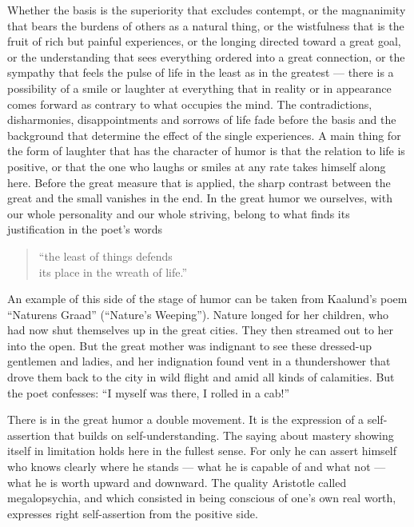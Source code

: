 \documentclass[12pt]{book}
\newcommand{\opage}[1]{\marginnote{\footnotesize\textit{[#1]}}}
\begin{document}
Whether the basis is the superiority that excludes contempt, or the magnanimity
that bears the burdens of others as a natural thing, or the wistfulness that is
the fruit of rich but painful experiences, or the longing directed toward a great
goal, or the understanding that sees everything ordered into a great connection,
or the sympathy that feels the pulse of life in the least as in the greatest ---
there is a possibility of a smile or laughter at everything that in reality or in
appearance comes forward as contrary to what occupies the mind. The contradictions,
disharmonies, disappointments and sorrows of life fade before the basis and the
background that determine the effect of the single experiences. A main thing for
the form of laughter that has the character of humor is that the relation to life
is positive, or that the one who laughs or smiles at any rate takes himself along
here. Before the great measure that is applied, the sharp contrast between the
great and the small vanishes in the end. In the great humor we ourselves, with our
whole personality and our whole striving, belong to what finds its justification in
the poet's words
\begin{quote}
``the least of things defends\\
its place in the wreath of life.''
\end{quote}

\opage{57}An example of this side of the stage of humor can be taken from
Kaalund's poem ``Naturens Graad'' (``Nature's Weeping''). Nature longed for her
children, who had now shut themselves up in the great cities. They then streamed
out to her into the open. But the great mother was indignant to see these dressed-up
gentlemen and ladies, and her indignation found vent in a thundershower that drove
them back to the city in wild flight and amid all kinds of calamities. But the poet
confesses: ``I myself was there, I rolled in a cab!''

There is in the great humor a double movement. It is the expression of a
self-assertion that builds on self-understanding. The saying about mastery showing
itself in limitation holds here in the fullest sense. For only he can assert himself
who knows clearly where he stands --- what he is capable of and what not --- what
he is worth upward and downward. The quality Aristotle called megalopsychia, and
which consisted in being conscious of one's own real worth, expresses right
self-assertion from the positive side.
\end{document}
